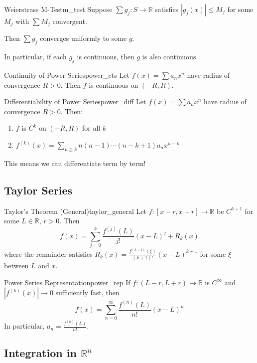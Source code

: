 \documentclass[11pt, letterpaper, openany]{book}
\begin{document}
\begin{thm}{Weierstrass M-Test}{m_test}
Suppose $\sum g_j: S \to \mathbb{R}$ satisfies $|g_j(x)| \leq M_j$ for some $M_j$ with $\sum M_j$ convergent.

Then $\sum g_j$ converges uniformly to some $g$.

In particular, if each $g_j$ is continuous, then $g$ is also continuous.
\end{thm}

\begin{thm}{Continuity of Power Series}{power_cts}
Let $f(x) = \sum a_n x^n$ have radius of convergence $R > 0$. Then $f$ is continuous on $(-R, R)$.
\end{thm}

\begin{thm}{Differentiability of Power Series}{power_diff}
Let $f(x) = \sum a_n x^n$ have radius of convergence $R > 0$. Then:
\begin{enumerate}
    \item $f$ is $C^k$ on $(-R, R)$ for all $k$
    \item $f^{(k)}(x) = \sum_{n \geq k} n(n-1)\cdots(n-k+1) a_n x^{n-k}$
\end{enumerate}
This means we can differentiate term by term!
\end{thm}

\subsection{Taylor Series}

\begin{thm}{Taylor's Theorem (General)}{taylor_general}
Let $f: [x-r, x+r] \to \mathbb{R}$ be $C^{k+1}$ for some $L \in \mathbb{R}$, $r > 0$. Then
\[f(x) = \sum_{j=0}^k \frac{f^{(j)}(L)}{j!}(x-L)^j + R_k(x)\]
where the remainder satisfies $R_k(x) = \frac{f^{(k+1)}(\xi)}{(k+1)!}(x-L)^{k+1}$ for some $\xi$ between $L$ and $x$.
\end{thm}

\begin{cor}{Power Series Representation}{power_rep}
If $f: (L-r, L+r) \to \mathbb{R}$ is $C^\infty$ and $|f^{(k)}(x)| \to 0$ sufficiently fast, then
\[f(x) = \sum_{n=0}^\infty \frac{f^{(n)}(L)}{n!}(x-L)^n\]
In particular, $a_n = \frac{f^{(n)}(L)}{n!}$.
\end{cor}

\subsection{Integration in $\mathbb{R}^n$}
\end{document}
